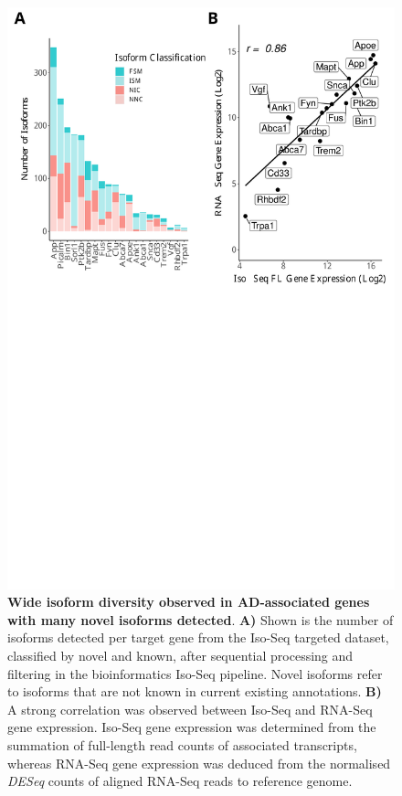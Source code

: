\begin{figure}[!htp]
	\begin{center}
		\includegraphics[page=1,trim={0 20cm 0 0cm},clip,scale = 0.60]{Figures/ONTvsIsoSeq.pdf}
	\end{center}
	\captionsetup{width=0.95\textwidth}
	\caption[Wide isoform diversity in AD-associated genes from Targeted Sequencing in mouse cortex]%
	{\textbf{Wide isoform diversity observed in AD-associated genes with many novel isoforms detected}. \textbf{A)} Shown is the number of isoforms detected per target gene from the Iso-Seq targeted dataset, classified by novel and known, after sequential processing and filtering in the bioinformatics Iso-Seq pipeline. Novel isoforms refer to isoforms that are not known in current existing annotations. \textbf{B)} A strong correlation was observed between Iso-Seq and RNA-Seq gene expression. Iso-Seq gene expression was determined from the summation of full-length read counts of associated transcripts, whereas RNA-Seq gene expression was deduced from the normalised \textit{DESeq} counts of aligned RNA-Seq reads to reference genome\cite{Castanho2020}.}
	\label{fig:isoseq_targeted_finalnumberiso}
\end{figure}


